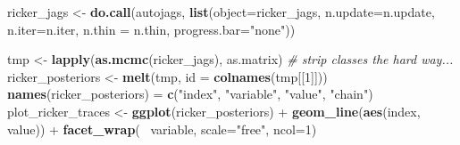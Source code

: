 \documentclass[author-year, review]{elsarticle} %
\newenvironment{Shaded}{}{}
\newcommand{\KeywordTok}[1]{\textcolor[rgb]{0.00,0.44,0.13}{\textbf{{#1}}}}
\newcommand{\DataTypeTok}[1]{\textcolor[rgb]{0.56,0.13,0.00}{{#1}}}
\newcommand{\DecValTok}[1]{\textcolor[rgb]{0.25,0.63,0.44}{{#1}}}
\newcommand{\FloatTok}[1]{\textcolor[rgb]{0.25,0.63,0.44}{{#1}}}
\newcommand{\StringTok}[1]{\textcolor[rgb]{0.25,0.44,0.63}{{#1}}}
\newcommand{\CommentTok}[1]{\textcolor[rgb]{0.38,0.63,0.69}{\textit{{#1}}}}
\newcommand{\NormalTok}[1]{{#1}}
\begin{document}
\begin{Shaded}
\begin{Highlighting}[]
\NormalTok{ricker_jags <- }\KeywordTok{do.call}\NormalTok{(autojags, }
                       \KeywordTok{list}\NormalTok{(}\DataTypeTok{object=}\NormalTok{ricker_jags, }\DataTypeTok{n.update=}\NormalTok{n.update, }
                                                        \DataTypeTok{n.iter=}\NormalTok{n.iter, }\DataTypeTok{n.thin =} \NormalTok{n.thin, }
                                                        \DataTypeTok{progress.bar=}\StringTok{"none"}\NormalTok{))}
\end{Highlighting}
\end{Shaded}

\begin{Shaded}
\begin{Highlighting}[]
\NormalTok{tmp <- }\KeywordTok{lapply}\NormalTok{(}\KeywordTok{as.mcmc}\NormalTok{(ricker_jags), as.matrix) }\CommentTok{# strip classes the hard way...}
\NormalTok{ricker_posteriors <- }\KeywordTok{melt}\NormalTok{(tmp, }\DataTypeTok{id =} \KeywordTok{colnames}\NormalTok{(tmp[[}\DecValTok{1}\NormalTok{]])) }
\KeywordTok{names}\NormalTok{(ricker_posteriors) = }\KeywordTok{c}\NormalTok{(}\StringTok{"index"}\NormalTok{, }\StringTok{"variable"}\NormalTok{, }\StringTok{"value"}\NormalTok{, }\StringTok{"chain"}\NormalTok{)}
\NormalTok{plot_ricker_traces <- }\KeywordTok{ggplot}\NormalTok{(ricker_posteriors) + }\KeywordTok{geom_line}\NormalTok{(}\KeywordTok{aes}\NormalTok{(index, value)) + }
  \KeywordTok{facet_wrap}\NormalTok{(~ variable, }\DataTypeTok{scale=}\StringTok{"free"}\NormalTok{, }\DataTypeTok{ncol=}\DecValTok{1}\NormalTok{)}
\end{Highlighting}
\end{Shaded}

\begin{Shaded}
\end{Shaded}
\end{document}
